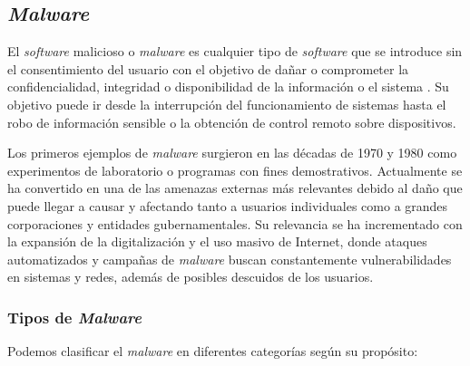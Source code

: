 \newpage
\subsection{\textit{Malware}}
\label{subsec:malware}

El \textit{software} malicioso o \textit{malware} es cualquier tipo de \textit{software} que se introduce sin el consentimiento del usuario con el objetivo de dañar o comprometer la confidencialidad, integridad o disponibilidad de la información o el sistema \cite{def_malware}. Su objetivo puede ir desde la interrupción del funcionamiento de sistemas hasta el robo de información sensible o la obtención de control remoto sobre dispositivos.

\vspace{1em}

Los primeros ejemplos de \textit{malware} surgieron en las décadas de 1970 y 1980 como experimentos de laboratorio o programas con fines demostrativos. Actualmente se ha convertido en una de las amenazas externas más relevantes debido al daño que puede llegar a causar y afectando tanto a usuarios individuales como a grandes corporaciones y entidades gubernamentales. Su relevancia se ha incrementado con la expansión de la digitalización y el uso masivo de Internet, donde ataques automatizados y campañas de \textit{malware} buscan constantemente vulnerabilidades en sistemas y redes, además de posibles descuidos de los usuarios.

\subsubsection{Tipos de \textit{Malware}}
\label{subsubsec:tipos_malware}

Podemos clasificar el \textit{malware} en diferentes categorías \cite{categoriamw} según su propósito:

